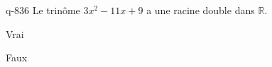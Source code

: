 \begin{truefalse}{q-836}
Le trinôme $3x^2-11x+9$ a une racine double dans $\mathbb R$.
\item Vrai
\item* Faux
\end{truefalse}

